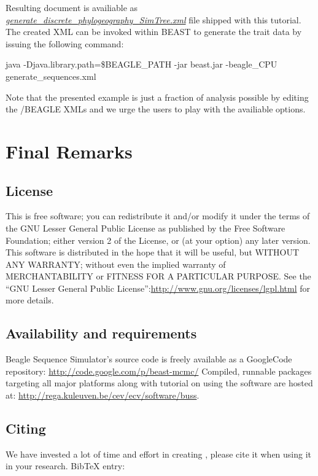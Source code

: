 Resulting document is availiable as \href{http://rega.kuleuven.be/cev/ecv/software/buss_files/generate\_discrete\_phylogeography\_SimTree.xml}{\emph{generate\_discrete\_phylogeography\_SimTree.xml}} file shipped with this tutorial.
The created XML can be invoked within BEAST to generate the trait data by issuing the following command:

\begin{code}
java -Djava.library.path=\$BEAGLE\_PATH -jar beast.jar -beagle\_CPU generate\_sequences.xml
\end{code}

Note that the presented example is just a fraction of analysis possible by editing the \bussname/BEAGLE XMLs and we urge the users to play with the availiable options. 

\section{Final Remarks}

\subsection{License}
This is free software; you can redistribute it and/or modify it under the terms of the {GNU} Lesser General Public License as published by the Free Software Foundation; either version 2 of the License, or (at your option) any later version. This software is distributed in the hope that it will be useful, but {WITHOUT ANY WARRANTY}; without even the implied warranty of {MERCHANTABILITY} or {FITNESS FOR A PARTICULAR PURPOSE}. See the ``GNU Lesser General Public License'':\url{http://www.gnu.org/licenses/lgpl.html} for more details.

\subsection{Availability and requirements}
Beagle Sequence Simulator's source code is freely available as a GoogleCode repository:
\url{http://code.google.com/p/beast-mcmc/}
Compiled, runnable packages targeting all major platforms along with tutorial on using the software are hosted at:
\url{http://rega.kuleuven.be/cev/ecv/software/buss}.

\subsection{Citing {\bussname}}
We have invested a lot of time and effort in creating {\bussname}, please cite it when using it in your research. BibTeX entry:

